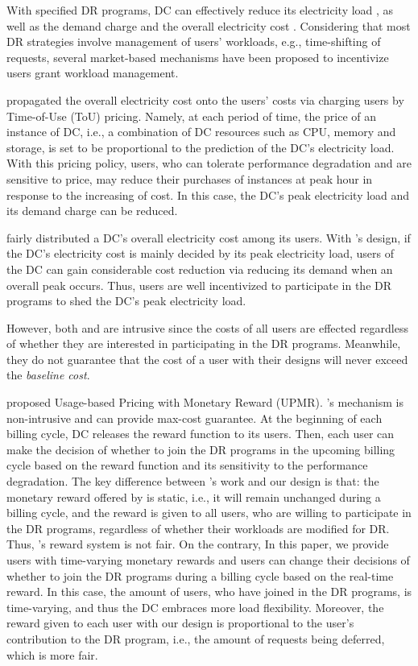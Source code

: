 \documentclass[conference]{IEEEtran}
\begin{document}
With specified DR programs, DC can effectively reduce its electricity load \cite{Liu2014}, as well as the demand charge and the overall electricity cost \cite{Mathew2014,Xu2014}. Considering that most DR strategies involve management of users' workloads, e.g., time-shifting of requests, several market-based mechanisms have been proposed to incentivize users grant workload management\cite{Zhan2016,Nasiriani2015,Wang2015,Zhan2015,Wang2014a}. 

\cite{Zhan2015} propagated the overall electricity cost onto the users' costs via charging users by Time-of-Use (ToU) pricing. Namely, at each period of time, the price of an instance of DC, i.e., a combination of DC resources such as CPU, memory and storage, is set to be proportional to the prediction of the DC's electricity load. With this pricing policy, users, who can tolerate performance degradation and are sensitive to price, may reduce their purchases of instances at peak hour in response to the increasing of cost. In this case, the DC's peak electricity load and its demand charge can be reduced. 

\cite{Nasiriani2015} fairly distributed a DC's overall electricity cost among its users. With \cite{Nasiriani2015}'s design, if the DC's electricity cost is mainly decided by its peak electricity load, users of the DC can gain considerable cost reduction via reducing its demand when an overall peak occurs. Thus, users are well incentivized to participate in the DR programs to shed the DC's peak electricity load.

However, both \cite{Zhan2015} and \cite{Nasiriani2015} are intrusive since the costs of all users are effected regardless of whether they are interested in participating in the DR programs. Meanwhile, they do not guarantee that the cost of a user with their designs will never exceed the \emph{baseline cost}. 

\cite{Zhan2016} proposed Usage-based Pricing with Monetary Reward (UPMR). \cite{Zhan2016}'s mechanism is non-intrusive and can provide max-cost guarantee. At the beginning of each billing cycle, DC releases the reward function to its users. Then, each user can make the decision of whether to join the DR programs in the upcoming billing cycle based on the reward function and its sensitivity to the performance degradation. The key difference between \cite{Zhan2016}'s work and our design is that: the monetary reward offered by \cite{Zhan2016} is static, i.e., it will remain unchanged during a billing cycle, and the reward is given to all users, who are willing to participate in the DR programs, regardless of whether their workloads are modified for DR. Thus, \cite{Zhan2016}'s reward system is not fair. On the contrary, In this paper, we provide users with time-varying monetary rewards and users can change their decisions of whether to join the DR programs during a billing cycle based on the real-time reward. In this case, the amount of users, who have joined in the DR programs, is time-varying, and thus the DC embraces more load flexibility. Moreover, the reward given to each user with our design is proportional to the user's contribution to the DR program, i.e., the amount of requests being deferred, which is more fair.
\end{document}
